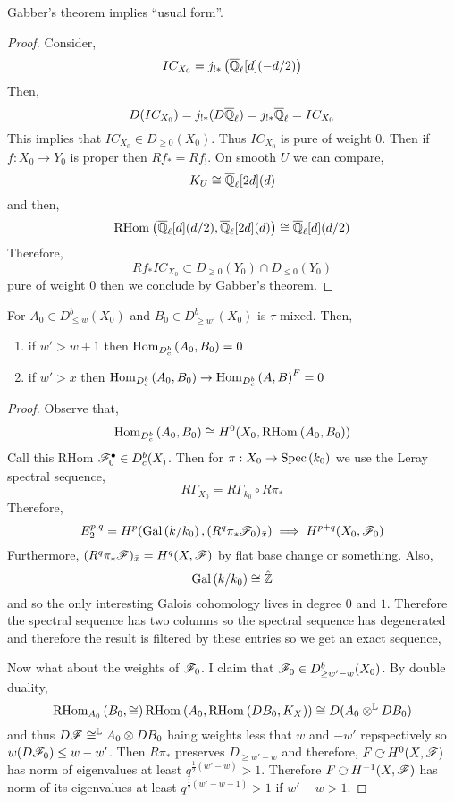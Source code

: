 \documentclass[12pt]{article}
\begin{document}
\begin{theorem}
Gabber's theorem implies ``usual form''.
\end{theorem}

\begin{proof}
Consider,
\[ IC_{X_0} = j_{!*} \left( \overline{\mathbb{Q}}_\ell[d] (-d/2) \right) \]
Then,
\[ D(IC_{X_0}) = j_{!*}(D \overline{\mathbb{Q}}_\ell) = j_{!*} \overline{\mathbb{Q}}_\ell = IC_{X_0} \]
This implies that $IC_{X_0} \in D_{\ge 0}(X_0)$. Thus $IC_{X_0}$ is pure of weight $0$.  Then if $f : X_0 \to Y_0$ is proper then $R f_* = R f_!$. On smooth $U$ we can compare,
\[ K_U \cong \overline{\mathbb{Q}}_\ell[2d](d) \]
and then,
\[ \mathrm{RHom}_{} \left( \overline{\mathbb{Q}}_\ell[d](d/2), \overline{\mathbb{Q}}_\ell[2d](d) \right) \cong \overline{\mathbb{Q}}_\ell[d](d/2) \]
Therefore,
\[ Rf_* IC_{X_0} \subset D_{\ge 0}(Y_0) \cap D_{\le 0}(Y_0) \]
pure of weight $0$ then we conclude by Gabber's theorem. 
\end{proof}

\begin{prop}
For $A_0 \in D^b_{\le w}(X_0)$ and $B_0 \in D^b_{\ge w'}(X_0)$ is $\tau$-mixed. Then,
\begin{enumerate}
\item if $w' > w + 1$ then $\mathrm{Hom}_{D_c^b} \left( A_0, B_0 \right) = 0$
\item if $w' > x$ then $\mathrm{Hom}_{D^b_c} \left( A_0, B_0 \right) \to \mathrm{Hom}_{D^b_c} \left( A, B \right)^F = 0$
\end{enumerate}
\end{prop}

\begin{proof}
Observe that,
\[ \mathrm{Hom}_{D^b_c} \left( A_0, B_0 \right) \cong H^0(X_0, \mathrm{RHom}_{} \left( A_0, B_0 \right)) \]
Call this RHom $\mathscr{F}_0^\bullet \in D^b_c(X_)$. Then for $\pi : X_0 \to \mathrm{Spec}\left( k_0 \right)$ we use the Leray spectral sequence,
\[ R \Gamma_{X_0} = R \Gamma_{k_0} \circ R \pi_* \]
Therefore,
\[ E_2^{p,q} = H^p(\mathrm{Gal}\left( k/k_0 \right), (R^q \pi_* \mathscr{F}_0)_{\bar{x}}) \implies H^{p+q}(X_0, \mathscr{F}_0) \]
Furthermore, $(R^q \pi_* \mathscr{F})_{\bar{x}} = H^q(X, \mathscr{F})$ by flat base change or something. Also,
\[ \mathrm{Gal}\left( k/k_0 \right) \cong \hat{\mathbb{Z}} \]
and so the only interesting Galois cohomology lives in degree $0$ and $1$. Therefore the spectral sequence has two columns so the spectral sequence has degenerated and therefore the result is filtered by these entries so we get an exact sequence,
\begin{center}
\end{center}
Now what about the weights of $\mathscr{F}_0$. I claim that $\mathscr{F}_0 \in D^b_{\ge w' - w}(X_0)$. By double duality,
\[ \mathrm{RHom}_{A_0} \left( B_0, \cong \right) \mathrm{RHom}_{} \left( A_0, \mathrm{RHom}_{} \left( D B_0, K_X \right) \right) \cong D(A_0 \otimes^{\mathbb{L}} D B_0) \]
and thus $D \mathscr{F} \cong^{\mathbb{L}} A_0 \otimes D B_0$ haing weights less that $w$ and $-w'$ repspectively so $w(D \mathscr{F}_0) \le w - w'$.  Then $R \pi_*$ preserves $D_{\ge w' - w}$ and therefore, $F \acts H^0(X, \F)$ has norm of eigenvalues at least $q^{\frac{1}{2}(w'-w)} > 1$. Therefore $F \acts H^{-1}(X, \F)$ has norm of its eigenvalues at least $q^{\frac{1}{2}(w' - w - 1)} > 1$ if $w' - w > 1$.
\end{proof}
\end{document}
